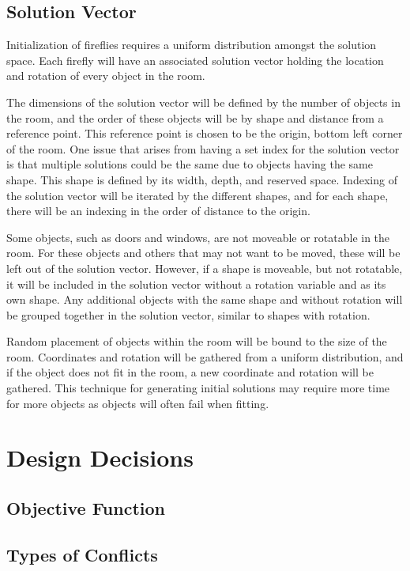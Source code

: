 \documentclass[conference]{IEEEtran}
\begin{document}
    \subsection{Solution Vector}
    Initialization of fireflies requires a uniform distribution amongst the solution space. Each firefly will have an associated solution vector holding the location and rotation of every object in the room. 
    
    The dimensions of the solution vector will be defined by the number of objects in the room, and the order of these objects will be by shape and distance from a reference point. This reference point is chosen to be the origin, bottom left corner of the room. One issue that arises from having a set index for the solution vector is that multiple solutions could be the same due to objects having the same shape. This shape is defined by its width, depth, and reserved space. Indexing of the solution vector will be iterated by the different shapes, and for each shape, there will be an indexing in the order of distance to the origin.
    
    Some objects, such as doors and windows, are not moveable or rotatable in the room. For these objects and others that may not want to be moved, these will be left out of the solution vector. However, if a shape is moveable, but not rotatable, it will be included in the solution vector without a rotation variable and as its own shape. Any additional objects with the same shape and without rotation will be grouped together in the solution vector, similar to shapes with rotation.
    
    Random placement of objects within the room will be bound to the size of the room. Coordinates and rotation will be gathered from a uniform distribution, and if the object does not fit in the room, a new coordinate and rotation will be gathered. This technique for generating initial solutions may require more time for more objects as objects will often fail when fitting.
    

\section{Design Decisions}
    \subsection{Objective Function}


    \subsection{Types of Conflicts}
\end{document}
